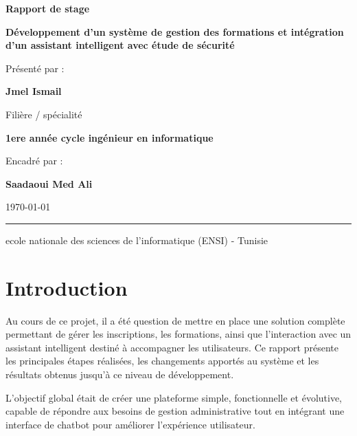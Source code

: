\documentclass[11pt,a4paper]{report}
\begin{document}
\begin{titlepage}
    \centering
    \vspace*{2cm}
    {\Large \textbf{Rapport de stage}}\par
    \vspace{1cm}
    {\LARGE \textbf{Développement d’un système de gestion des formations et intégration d’un assistant intelligent avec étude de sécurité}}\par
    \vspace{1.5cm}
    {\large Présenté par :}\par
    \vspace{0.3cm}
    {\Large \textbf{Jmel Ismail}}\par
    \vspace{0.8cm}
    {\large Filière / spécialité}\par
    \vspace{0.2cm}
    {\large \textbf{1ere année cycle ingénieur en informatique}}\par
    \vspace{1.5cm}
    {\large Encadré par :}\par
    \vspace{0.2cm}
    {\large \textbf{Saadaoui Med Ali}}\par
    \vspace{2cm}
    {\large \today}\par
    \vspace{1cm}
    \rule{0.8\textwidth}{0.5pt}
    \vspace{0.5cm}
    {\large ecole nationale des sciences de l’informatique (ENSI) - Tunisie}\par
\end{titlepage}

\tableofcontents
\thispagestyle{empty}
\clearpage

\chapter*{Introduction}
Au cours de ce projet, il a été question de mettre en place une solution complète permettant de gérer les inscriptions, les formations, ainsi que l’interaction avec un assistant intelligent destiné à accompagner les utilisateurs. Ce rapport présente les principales étapes réalisées, les changements apportés au système et les résultats obtenus jusqu’à ce niveau de développement.

L’objectif global était de créer une plateforme simple, fonctionnelle et évolutive, capable de répondre aux besoins de gestion administrative tout en intégrant une interface de chatbot pour améliorer l’expérience utilisateur.
\end{document}
